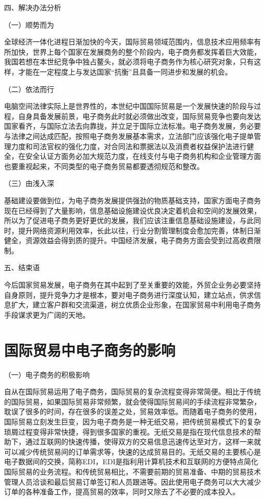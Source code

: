 四、解决办法分析

（一）顺势而为

全球经济一体化进程日渐加快的今天，国际贸易领域范围内，信息技术应用频率有所加快，世界上每个国家在发展商务的整个阶段内，电子商务都发挥着巨大效能，我国若想在本世纪竞争中独占鳌头，就必须将电子商务作为核心研究对象，只有这样，才能在一定程度上与发达国家“抗衡”且具备一同进步和发展的机会。

（二）依法而行

电脑空间法律实际上是世界性的，本世纪中国国际贸易是一个发展快速的阶段与过程，自身具备发展前景，电子商务此时就必须做出改变，国际贸易竞争也要向发达国家看齐，与国际立法去向靠拢，并立足于国际立法标准。电子商务发展，务必要与法律之间达成匹配，按照电子商务发展基本需求，立法部门应该强化电子提单管理力度和司法官权的强化力度，对合同法和票据法以及消费者权益保护法进行健全，在安全认证方面务必加大规范力度，在线支付与电子商务机构和企业管理方面也要重视起来，不同类型的电子商务贸易都要透彻规范和整改。

（三）由浅入深

基础建设要做到位，为电子商务发展提供强劲的物质基础支持，国家方面电子商务现在已经得到了大量影响，信息基础设施建设优良决定着机会和空间的发展效果，所以为了促进电子商务更好更优的发展，我们应该注重信息基础设施建设，与此同时，提升网络资源利用效率，长此以往，行业分割管理制度会愈加完善，体制日渐健全，资源效益会得到质的提升。中国经济发展，电子商务方面会受到过高收费限制。

五、结束语

今后国家贸易发展，电子商务在其中起到了至关重要的效能，外贸企业务必要坚持自身原则，提升竞争力才是根本，要对电子商务进行深度认知，建立站点，供求信息扩大，建立客户群和交流渠道，树立优质企业形象，在国家贸易中利用电子商务手段谋求更为广阔的天地。 



\section{国际贸易中电子商务的影响}

（一）电子商务的积极影响

自从在国际贸易运用了电子商务，国际贸易的复杂流程变得非常简便。相比于传统的国际贸易，如果国际贸易非常频繁，就会使得国际贸易间的手续流程非常繁杂，耽误了很多的时间，存在很多的误差之处，贸易效率低。而随着电子商务的使用，国际贸易立刻发生巨变，因为电子商务是一种无纸交易，把传统贸易模式下的复杂琐屑过程变得非常快捷，得到很多国家的重视。无纸交易是指在现代信息技术的帮助下，通过互联网的快速传播，使得双方的交易信息迅速传达至对方，这样一来就可以减少传统贸易间的订单需求等，快速的达成贸易目的。无纸交易的主要核心是电子数据间的交换，简称EDI，EDI是指利用计算机技术和互联网的方便特点简化国际贸易的业务流程。和传统贸易相比，不需要前期的贸易准备、中期的贸易技术管理人员洽谈和最后贸易订单签订和人员跟进等。因此使用电子商务可以大大减少订单的各种准备工作，提高贸易的效率，同时又除去了不必要的成本投入。

